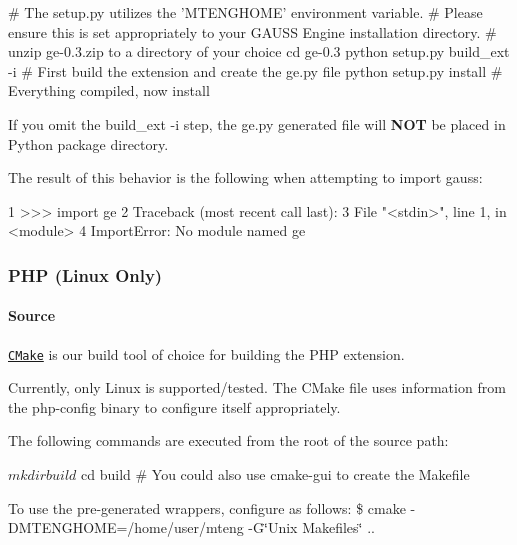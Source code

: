 \begin{DoxyCode}
\textcolor{preprocessor}{# The setup.py utilizes the 'MTENGHOME' environment variable.}
\textcolor{preprocessor}{}\textcolor{preprocessor}{# Please ensure this is set appropriately to your GAUSS Engine installation directory.}
\textcolor{preprocessor}{}\textcolor{preprocessor}{# unzip ge-0.3.zip to a directory of your choice}
\textcolor{preprocessor}{}cd ge-0.3
python setup.py build\_ext -i      # First build the extension and create the ge.py file
python setup.py install           # Everything compiled, now install
\end{DoxyCode}


If you omit the {\ttfamily build\-\_\-ext -\/i} step, the {\ttfamily ge.\-py} generated file will {\bfseries N\-O\-T} be placed in Python package directory.

The result of this behavior is the following when attempting to {\ttfamily import gauss}\-:


\begin{DoxyCode}
1 >>> \textcolor{keyword}{import} ge
2 Traceback (most recent call last):
3   File \textcolor{stringliteral}{"<stdin>"}, line 1, \textcolor{keywordflow}{in} <module>
4 ImportError: No module named ge
\end{DoxyCode}


\subsubsection*{P\-H\-P (Linux Only)}

\paragraph*{Source}

\href{http://www.cmake.org}{\tt C\-Make} is our build tool of choice for building the P\-H\-P extension.

Currently, only Linux is supported/tested. The C\-Make file uses information from the {\ttfamily php-\/config} binary to configure itself appropriately.

The following commands are executed from the root of the source path\-: \begin{DoxyVerb}$ mkdir build
$ cd build
# You could also use cmake-gui to create the Makefile
\end{DoxyVerb}


To use the pre-\/generated wrappers, configure as follows\-: \$ cmake -\/\-D\-M\-T\-E\-N\-G\-H\-O\-M\-E=/home/user/mteng -\/\-G\char`\"{}\-Unix Makefiles\char`\"{} ..

